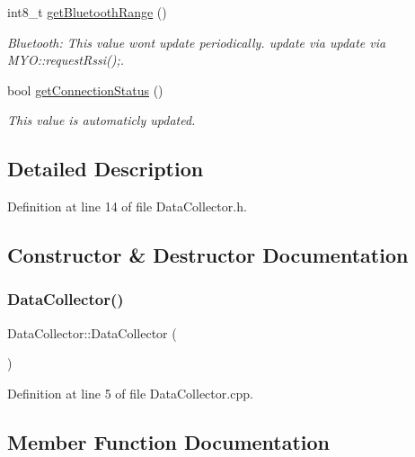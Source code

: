 \begin{DoxyCompactItemize}
int8\+\_\+t \mbox{\hyperlink{class_data_collector_a4992b2e777defed813c7ce15a73bc84b}{get\+Bluetooth\+Range}} ()
\begin{DoxyCompactList}\small\item\em Bluetooth\+: This value wont update periodically. update via update via M\+Y\+O\+::request\+Rssi();. \end{DoxyCompactList}\item 
bool \mbox{\hyperlink{class_data_collector_a2dbac95176fb77c1714573e41ba4490f}{get\+Connection\+Status}} ()
\begin{DoxyCompactList}\small\item\em This value is automaticly updated. \end{DoxyCompactList}\end{DoxyCompactItemize}


\subsection{Detailed Description}


Definition at line 14 of file Data\+Collector.\+h.



\subsection{Constructor \& Destructor Documentation}
\mbox{\label{class_data_collector_a6f7eccfdf026a83317c386a18d16397d}} 
\subsubsection{\texorpdfstring{Data\+Collector()}{DataCollector()}}
{\footnotesize\ttfamily Data\+Collector\+::\+Data\+Collector (\begin{DoxyParamCaption}{ }\end{DoxyParamCaption})}



Definition at line 5 of file Data\+Collector.\+cpp.



\subsection{Member Function Documentation}
\mbox{\label{class_data_collector_a1ef7a2beb37a42d4ac887fef90ac8947}} 
